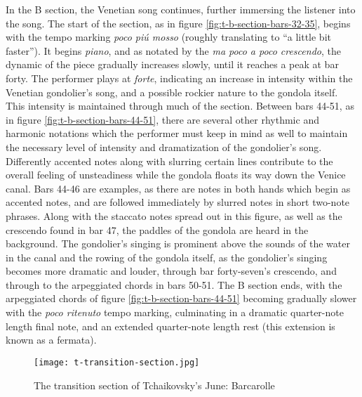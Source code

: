 In the B section, the Venetian song continues, further immersing the listener into the song. The start of the section, as in figure \ref{fig:t-b-section-bars-32-35}\autocite{Henle_2002}, begins with the tempo marking \textit{poco piú mosso} (roughly translating to ``a little bit faster''). It begins \textit{piano}, and as notated by the \textit{ma poco a poco crescendo}, the dynamic of the piece gradually increases slowly, until it reaches a peak at bar forty. The performer plays at \textit{forte}, indicating an increase in intensity within the Venetian gondolier's song, and a possible rockier nature to the gondola itself. This intensity is maintained through much of the section. Between bars 44-51, as in figure \ref{fig:t-b-section-bars-44-51}\autocite{Henle_2002}, there are several other rhythmic and harmonic notations which the performer must keep in mind as well to maintain the necessary level of intensity and dramatization of the gondolier's song. Differently accented notes along with slurring certain lines contribute to the overall feeling of unsteadiness while the gondola floats its way down the Venice canal. Bars 44-46 are examples, as there are notes in both hands which begin as accented notes, and are followed immediately by slurred notes in short two-note phrases. Along with the staccato notes spread out in this figure, as well as the crescendo found in bar 47, the paddles of the gondola are heard in the background. The gondolier's singing is prominent above the sounds of the water in the canal and the rowing of the gondola itself, as the gondolier's singing becomes more dramatic and louder, through bar forty-seven's crescendo, and through to the arpeggiated chords in bars 50-51. The B section ends, with the arpeggiated chords of figure \ref{fig:t-b-section-bars-44-51}\autocite{Henle_2002} becoming gradually slower with the \textit{poco ritenuto} tempo marking, culminating in a dramatic quarter-note length final note, and an extended quarter-note length rest (this extension is known as a fermata).

\begin{figure}
  \centering
  \texttt{[image: t-transition-section.jpg]}
  \caption[Transitioning between B section and A' section in Tchaikovsky's June: Barcarolle]{The transition section of Tchaikovsky's June: Barcarolle}
  \label{fig:t-transition-section}
\end{figure}

